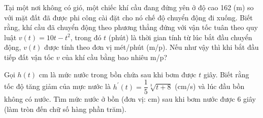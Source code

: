 \begin{ex}%
    Tại một nơi không có gió, một chiếc khí cầu đang đứng yên ở độ cao 162 (m) so với mặt đất đã được phi công cài đặt cho nó chế độ chuyển động đi xuống. Biết rằng, khí cầu đã chuyển động theo phương thẳng đứng với vận tốc tuân theo quy luật $v(t)=10 t-t^2$, trong đó $t$ (phút) là thời gian tính từ lúc bắt đầu chuyển động, $v(t)$ được tính theo đơn vị mét/phút (m/p). Nếu như vậy thì khi bắt đầu tiếp đất vận tốc $v$ của khí cầu bằng bao nhiêu m/p?
\end{ex}

\begin{ex}%
    Gọi $h(t)$ cm là mức nước trong bồn chứa sau khi bơm được $t$ giây. Biết rằng tốc độ tăng giảm của mực nước là $h^{\prime}(t)=\dfrac{1}{5} \sqrt[3]{t+8}$ (cm/s) và lúc đầu bồn không có nước. Tìm mức nước ở bồn (đơn vị: cm) sau khi bơm nước được $6$ giây (làm tròn đến chữ số hàng phần trăm).
\end{ex}

